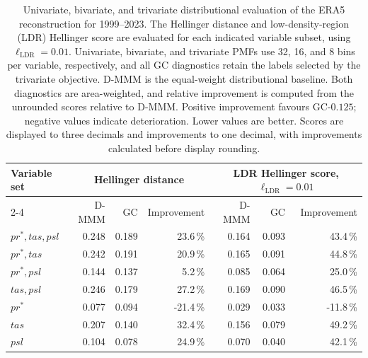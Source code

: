 \begin{table}[t]
\centering
\small
\setlength{\tabcolsep}{4pt}
\caption{Univariate, bivariate, and trivariate distributional evaluation of the ERA5 reconstruction for 1999--2023. The Hellinger distance and low-density-region (LDR) Hellinger score are evaluated for each indicated variable subset, using \(\ell_{\mathrm{LDR}}=0.01\). Univariate, bivariate, and trivariate PMFs use 32, 16, and 8 bins per variable, respectively, and all GC diagnostics retain the labels selected by the trivariate objective. D-MMM is the equal-weight distributional baseline. Both diagnostics are area-weighted, and relative improvement is computed from the unrounded scores relative to D-MMM. Positive improvement favours GC-\(0.125\); negative values indicate deterioration. Lower values are better. Scores are displayed to three decimals and improvements to one decimal, with improvements calculated before display rounding.}
\label{tab:era5_distributional_sensitivity}
\begin{tabular}{lrrrrrr}
\hline
Variable set
& \multicolumn{3}{c}{Hellinger distance}
& \multicolumn{3}{c}{LDR Hellinger score, \(\ell_{\mathrm{LDR}}=0.01\)} \\
\cline{2-4}\cline{5-7}
& D-MMM & GC & Improvement
& D-MMM & GC & Improvement \\
\hline
\(\mathit{pr}^{\ast},\mathit{tas},\mathit{psl}\)
& 0.248 & 0.189 & 23.6\,\%
& 0.164 & 0.093 & 43.4\,\% \\

\(\mathit{pr}^{\ast},\mathit{tas}\)
& 0.242 & 0.191 & 20.9\,\%
& 0.165 & 0.091 & 44.8\,\% \\

\(\mathit{pr}^{\ast},\mathit{psl}\)
& 0.144 & 0.137 & 5.2\,\%
& 0.085 & 0.064 & 25.0\,\% \\

\(\mathit{tas},\mathit{psl}\)
& 0.246 & 0.179 & 27.2\,\%
& 0.169 & 0.090 & 46.5\,\% \\

\(\mathit{pr}^{\ast}\)
& 0.077 & 0.094 & -21.4\,\%
& 0.029 & 0.033 & -11.8\,\% \\

\(\mathit{tas}\)
& 0.207 & 0.140 & 32.4\,\%
& 0.156 & 0.079 & 49.2\,\% \\

\(\mathit{psl}\)
& 0.104 & 0.078 & 24.9\,\%
& 0.070 & 0.040 & 42.1\,\% \\
\hline
\end{tabular}
\end{table}
